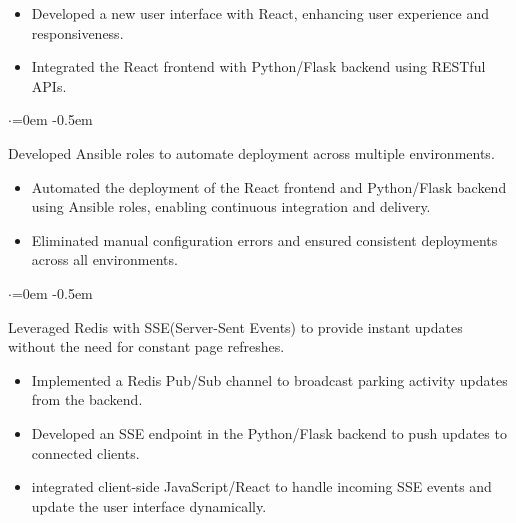 \documentclass{article}
\begin{document}
\vspace{-1.6em}
\begin{itemize}
    \item Developed a new user interface with React, enhancing user experience and responsiveness.
    \item Integrated the React frontend with  Python/Flask backend using RESTful APIs.
\end{itemize}

\begin{list}{$\cdot$}{\leftmargin=0em} %
    \itemsep -0.5em \vspace{-0.5em} %
    \item Developed Ansible roles to automate deployment across multiple environments.
\end{list}

\vspace{-1.6em}
\begin{itemize}
    \item  Automated the deployment of the React frontend and Python/Flask backend using Ansible roles, enabling continuous integration and delivery.
    \item Eliminated manual configuration errors and ensured consistent deployments across all environments.  
\end{itemize}



\begin{list}{$\cdot$}{\leftmargin=0em} %
    \itemsep -0.5em \vspace{-0.5em} %
    \item  Leveraged Redis with SSE(Server-Sent Events) to provide instant updates without the need for constant
    page refreshes.
\end{list}

\vspace{-1.6em}
\begin{itemize}
    \item Implemented a Redis Pub/Sub channel to broadcast parking activity updates from the backend.
    \item Developed an SSE endpoint in the Python/Flask backend to push updates to connected clients.
    \item integrated client-side JavaScript/React  to handle incoming SSE events and update the user interface dynamically.
\end{itemize}
\end{document}
